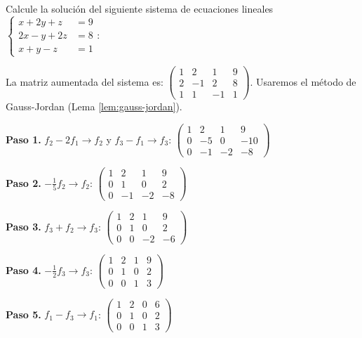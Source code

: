 \begin{example}
Calcule la solución del siguiente sistema de ecuaciones lineales $\begin{cases}
x + 2y + z &= 9 \\
2x - y + 2z &= 8 \\
x + y - z &= 1
\end{cases}:$

\begin{myproof} La matriz aumentada del sistema es:
$\left(\begin{array}{ccc|c}
1 & 2 & 1 & 9 \\
2 & -1 & 2 & 8 \\
1 & 1 & -1 & 1
\end{array}\right).$ Usaremos el método de Gauss-Jordan (Lema \ref{lem:gauss-jordan}).

\textbf{Paso 1.} $f_2 - 2f_1 \rightarrow f_2$ y $f_3 - f_1 \rightarrow f_3$:
$\left(\begin{array}{ccc|c}
1 & 2 & 1 & 9 \\
0 & -5 & 0 & -10 \\
0 & -1 & -2 & -8
\end{array}\right)$

\textbf{Paso 2.} $-\frac{1}{5}f_2 \rightarrow f_2$: $\left(\begin{array}{ccc|c}
1 & 2 & 1 & 9 \\
0 & 1 & 0 & 2 \\
0 & -1 & -2 & -8
\end{array}\right)$

\textbf{Paso 3.} $f_3 + f_2 \rightarrow f_3$: $\left(\begin{array}{ccc|c}
1 & 2 & 1 & 9 \\
0 & 1 & 0 & 2 \\
0 & 0 & -2 & -6
\end{array}\right)$

\textbf{Paso 4.} $-\frac{1}{2}f_3 \rightarrow f_3$: $\left(\begin{array}{ccc|c}
1 & 2 & 1 & 9 \\
0 & 1 & 0 & 2 \\
0 & 0 & 1 & 3
\end{array}\right)$

\textbf{Paso 5.}  $f_1 - f_3 \rightarrow f_1$: $\left(\begin{array}{ccc|c}
1 & 2 & 0 & 6 \\
0 & 1 & 0 & 2 \\
0 & 0 & 1 & 3
\end{array}\right)$


\end{myproof}
\end{example}
